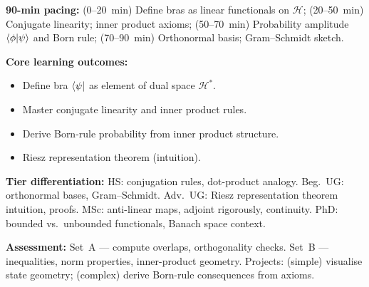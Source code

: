 \documentclass[11pt,a4paper]{article}
\begin{document}
\medskip
\begin{tcolorbox}[modulebox, title={Module~I.2 --- Lecture L02: Bras, Dual Space \& Inner Product Structure}]
\textbf{90-min pacing:} (0--20~min) Define bras as linear functionals on $\mathcal{H}$;
(20--50~min) Conjugate linearity; inner product axioms;
(50--70~min) Probability amplitude $\braket{\phi|\psi}$ and Born rule;
(70--90~min) Orthonormal basis; Gram--Schmidt sketch.

\medskip\textbf{Core learning outcomes:}
\begin{itemize}[leftmargin=1.4em,topsep=2pt,itemsep=1pt]
  \item Define bra $\bra{\psi}$ as element of dual space $\mathcal{H}^*$.
  \item Master conjugate linearity and inner product rules.
  \item Derive Born-rule probability from inner product structure.
  \item Riesz representation theorem (intuition).
\end{itemize}

\medskip\textbf{Tier differentiation:}
HS: conjugation rules, dot-product analogy.
Beg.\ UG: orthonormal bases, Gram--Schmidt.
Adv.\ UG: Riesz representation theorem intuition, proofs.
MSc: anti-linear maps, adjoint rigorously, continuity.
PhD: bounded vs.\ unbounded functionals, Banach space context.

\medskip\textbf{Assessment:}
Set~A --- compute overlaps, orthogonality checks.
Set~B --- inequalities, norm properties, inner-product geometry.
Projects: (simple) visualise state geometry; (complex) derive Born-rule consequences from axioms.
\end{tcolorbox}
\end{document}
